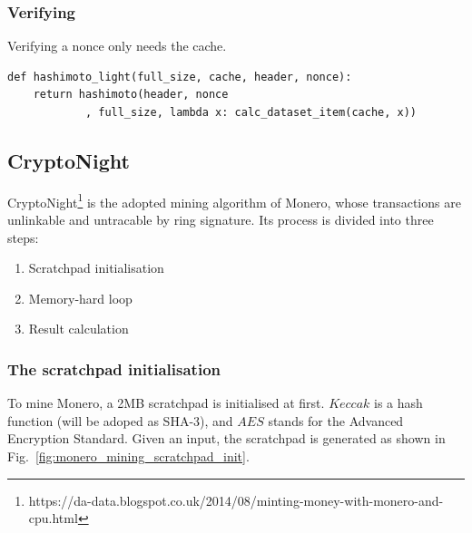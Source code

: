\documentclass[11pt]{article}
\begin{document}
\subsubsection{Verifying}

Verifying a nonce only needs the cache.

\begin{lstlisting}
def hashimoto_light(full_size, cache, header, nonce):
    return hashimoto(header, nonce
    		, full_size, lambda x: calc_dataset_item(cache, x))
\end{lstlisting}



\subsection{CryptoNight}

CryptoNight\footnote{https://da-data.blogspot.co.uk/2014/08/minting-money-with-monero-and-cpu.html} is the adopted mining algorithm of Monero, whose transactions are unlinkable and untracable by ring signature\cite{rivest2006leak}. Its process is divided into three steps:

\begin{enumerate}
\item Scratchpad initialisation
\item Memory-hard loop
\item Result calculation
\end{enumerate}

\subsubsection{The scratchpad initialisation}

To mine Monero, a 2MB scratchpad is initialised at first. $Keccak$\cite{bertoni2009keccak} is a hash function (will be adoped as SHA-3), and $AES$ stands for the Advanced Encryption Standard\cite{daemen2013design}. Given an input, the scratchpad is generated as shown in Fig.~\ref{fig:monero_mining_scratchpad_init}.
\end{document}
